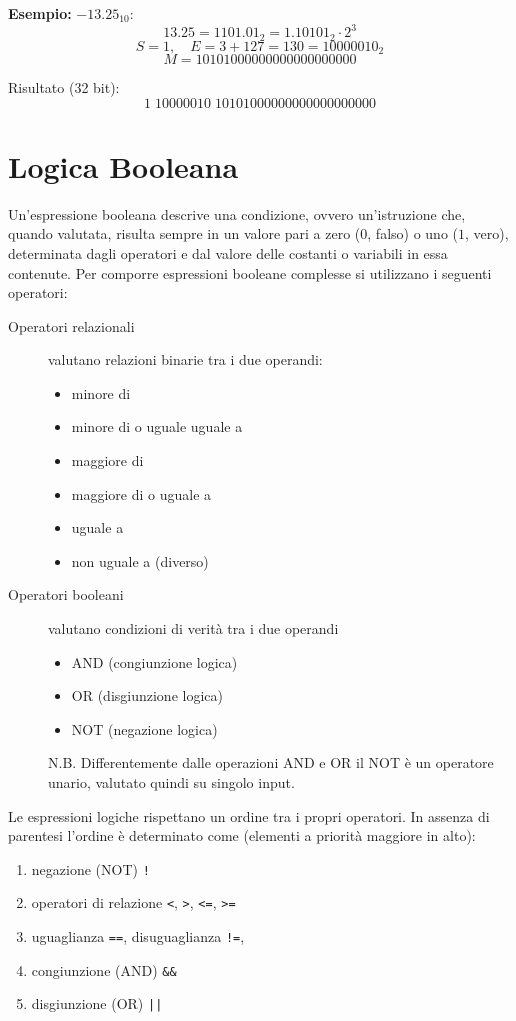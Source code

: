 \documentclass[oneside]{scrbook}
\begin{document}
\textbf{Esempio:}  
$-13.25_{10}$:
\[
13.25 = 1101.01_2 = 1.10101_2 \cdot 2^3
\]
\[
S = 1, \quad E = 3+127 = 130 = 10000010_2
\]
\[
M = 10101000000000000000000
\]

Risultato (32 bit):
\[
1 \; 10000010 \; 10101000000000000000000
\]

\clearpage

\section{Logica Booleana}
Un'espressione booleana descrive una condizione, ovvero un'istruzione che, quando valutata, risulta sempre in un valore pari a zero ($0$, falso) o uno ($1$, vero), determinata dagli operatori e dal valore delle costanti o variabili in essa contenute. Per comporre espressioni booleane complesse si utilizzano i seguenti operatori:

\begin{description}
\item[Operatori relazionali] valutano relazioni binarie tra i due operandi:
  \begin{itemize}
  \item [\texttt{<}] minore di
  \item [\texttt{<=}] minore di o uguale uguale a
  \item [\texttt{>}] maggiore di
  \item [\texttt{>=}] maggiore di o uguale a
  \item [\texttt{==}] uguale a
  \item [\texttt{!=}] non uguale a (diverso)
  \end{itemize}
\item[Operatori booleani] valutano condizioni di verit\`a tra i due operandi
  \begin{itemize}
  \item [\texttt{\&\&}] AND (congiunzione logica)
  \item [\texttt{||}] OR (disgiunzione logica)
  \item [\texttt{!}] NOT (negazione logica)
  \end{itemize}
    N.B. Differentemente dalle operazioni AND e OR il NOT \`e un operatore unario, valutato quindi su singolo input.
\end{description}

Le espressioni logiche rispettano un ordine tra i propri operatori. In assenza di parentesi l'ordine è determinato come (elementi a priorità maggiore in alto):
\begin{enumerate}
    \item negazione (NOT) \texttt{!}
    \item operatori di relazione \texttt{<}, \texttt{>}, \texttt{<=}, \texttt{>=}
    \item uguaglianza \texttt{==}, disuguaglianza \texttt{!=},
    \item congiunzione (AND) \texttt{\&\&}
    \item disgiunzione (OR) \texttt{||}
\end{enumerate}
\end{document}
